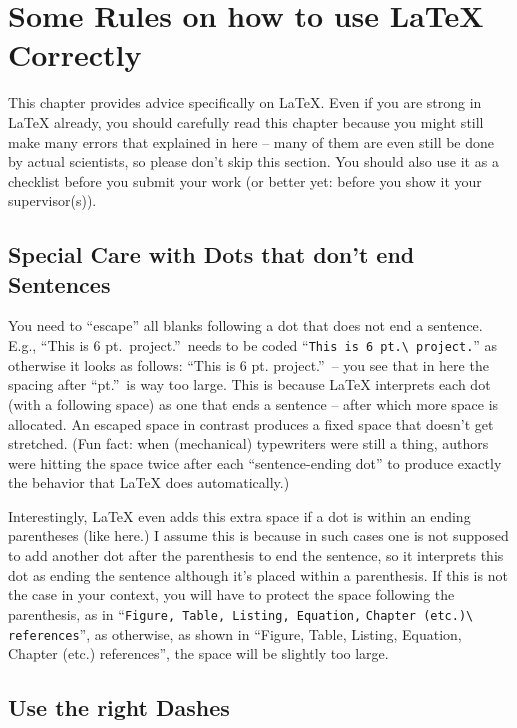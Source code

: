 \chapter{Some Rules on how to use \LaTeX{} Correctly}\label{chap:LaTeXAdvice}

This chapter provides advice specifically on \LaTeX{}. Even if you are strong in \LaTeX{} already, you should carefully read this chapter because you might still make many errors that explained in here -- many of them are even still be done by actual scientists, so please don't skip this section. You should also use it as a checklist before you submit your work (or better yet: before you show it your supervisor(s)).


\section{Special Care with Dots that don't end Sentences}

You need to ``escape'' all blanks following a dot that does not end a sentence. E.g., ``This is 6 pt.\ project.''\ needs to be coded ``\verb!This is 6 pt.\ project.!'' as otherwise it looks as follows: ``This is 6 pt. project.''\ -- you see that in here the spacing after ``pt.''\ is way too large. This is because \LaTeX{} interprets each dot (with a following space) as one that ends a sentence -- after which more space is allocated. An escaped space in contrast produces a fixed space that doesn't get stretched. (Fun fact: when (mechanical) typewriters were still a thing, authors were hitting the space twice after each ``sentence-ending dot'' to produce exactly the behavior that \LaTeX{} does automatically.)

Interestingly, \LaTeX{} even adds this extra space if a dot is within an ending parentheses (like here.) I assume this is because in such cases one is not supposed to add another dot after the parenthesis to end the sentence, so it interprets this dot as ending the sentence although it's placed within a parenthesis. If this is not the case in your context, you will have to protect the space following the parenthesis, as in ``\verb!Figure, Table, Listing, Equation,! \verb!Chapter (etc.)\ references!'', as otherwise, as shown in ``Figure, Table, Listing, Equation, Chapter (etc.) references'', the space will be slightly too large.


\section{Use the right Dashes}

